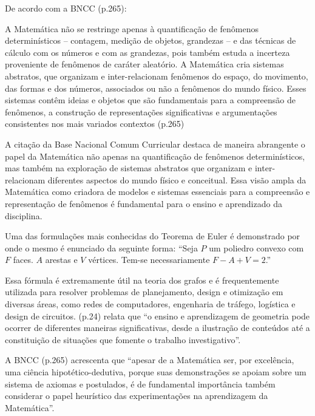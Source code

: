 De acordo com a BNCC \cite{Educacao.2018} (p.265):

\begin{citacao}
    A Matemática não se restringe apenas à quantificação de fenômenos determinísticos – contagem, medição de objetos, grandezas – e das técnicas de cálculo com os números e com as grandezas, pois também estuda a incerteza proveniente de fenômenos de caráter aleatório. A Matemática cria sistemas abstratos, que organizam e inter-relacionam fenômenos do espaço, do movimento, das formas e dos números, associados ou não a fenômenos do mundo físico. Esses sistemas contêm ideias e objetos que são fundamentais para a compreensão de fenômenos, a construção de representações significativas e argumentações consistentes nos mais variados contextos \cite{Educacao.2018} (p.265)
\end{citacao}

A citação da Base Nacional Comum Curricular destaca de maneira abrangente o papel da Matemática não apenas na quantificação de fenômenos determinísticos, mas também na exploração de sistemas abstratos que organizam e inter-relacionam diferentes aspectos do mundo físico e conceitual. Essa visão ampla da Matemática como criadora de modelos e sistemas essenciais para a compreensão e representação de fenômenos é fundamental para o ensino e aprendizado da disciplina.

Uma das formulações mais conhecidas do Teorema de Euler é demonstrado por  onde o mesmo é enunciado da seguinte forma: ``Seja $P$ um poliedro convexo com $F$ faces. $A$ arestas e $V$ vértices. Tem-se necessariamente \textcolor[HTML]{0000FF}{$F - A + V = 2$}.''

Essa fórmula é extremamente útil na teoria dos grafos e é frequentemente utilizada para resolver problemas de planejamento, design e otimização em diversas áreas, como redes de computadores, engenharia de tráfego, logística e design de circuitos.  (p.24) relata que ``o ensino e aprendizagem de geometria pode ocorrer de diferentes maneiras significativas, desde a ilustração de conteúdos até a constituição de situações que fomente o trabalho investigativo''.

A BNCC \cite{Educacao.2018} (p.265) acrescenta que ``apesar de a Matemática ser, por excelência, uma ciência hipotético-dedutiva, porque suas demonstrações se apoiam sobre um sistema de axiomas e postulados, é de fundamental importância também considerar o papel heurístico das experimentações na aprendizagem da Matemática''.


